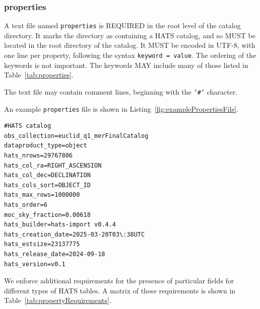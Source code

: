 \documentclass[11pt,a4paper]{ivoa}
\begin{document}
\subsubsection{properties} 

A text file named \texttt{properties} is REQUIRED in the root level of the catalog directory.
It marks the directory as containing a HATS catalog, and so MUST be located in the root directory of the catalog.
It MUST be encoded in UTF-8, with one line per property, following the syntax \texttt{keyword = value}.
The ordering of the keywords is not important. The keywords MAY include many of those listed in Table~\ref{tab:properties}.

The text file may contain comment lines, beginning with the \texttt{'\#'} character.

An example \texttt{properties} file is shown in Listing~\ref{fig:examplePropertiesFile}.

\begin{minipage}{\linewidth}
\begin{lstlisting}[caption=Example \texttt{properties} file contents, label=fig:examplePropertiesFile]
#HATS catalog
obs_collection=euclid_q1_merFinalCatalog
dataproduct_type=object
hats_nrows=29767806
hats_col_ra=RIGHT_ASCENSION
hats_col_dec=DECLINATION
hats_cols_sort=OBJECT_ID
hats_max_rows=1000000
hats_order=6
moc_sky_fraction=0.00618
hats_builder=hats-import v0.4.4
hats_creation_date=2025-03-20T03\:38UTC
hats_estsize=23137775
hats_release_date=2024-09-18
hats_version=v0.1
\end{lstlisting}
\end{minipage}

We enforce additional requirements for the presence of particular fields for different types of HATS tables. 
A matrix of these requirements is shown in Table~\ref{tab:propertyRequirements}.
\end{document}

